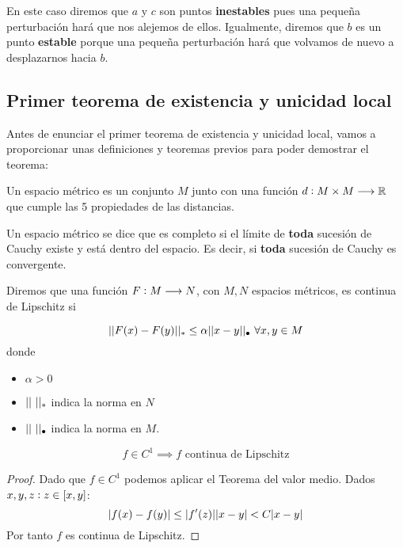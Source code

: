 En este caso diremos que $a$ y $c$ son puntos \textbf{inestables} pues una pequeña perturbación hará que nos alejemos de ellos. Igualmente, diremos que $b$ es un punto \textbf{estable} porque una pequeña perturbación hará que volvamos de nuevo a desplazarnos hacia $b$.


\subsection{Primer teorema de existencia y unicidad local}
Antes de enunciar el primer teorema de existencia y unicidad local, vamos a proporcionar unas definiciones y teoremas previos para poder demostrar el teorema:

\begin{definition}
Un espacio métrico es un conjunto $M$ junto con una función $d: M\times M \longrightarrow \mathbb{R}$ que cumple las 5 propiedades de las distancias.
\end{definition}

\begin{definition}
Un espacio métrico se dice que es completo si el límite de \textbf{toda} sucesión de Cauchy existe y está dentro del espacio. Es decir, si \textbf{toda} sucesión de Cauchy es convergente.
\end{definition}

\begin{definition}
Diremos que una función $F: M \longrightarrow N$, con $M, N$ espacios métricos, es continua de Lipschitz si

$$||F(x)-F(y)||_* \leq \alpha||x-y||_\bullet\ \forall x,y\in M$$ donde 
\begin{itemize}
\item $\alpha > 0$
\item $||\ ||_*$ indica la norma en $N$
\item $||\ ||_\bullet$ indica la norma en $M$.
\end{itemize}
\end{definition}

\begin{lemma}
$$f\in C^1 \implies f \text{ continua de Lipschitz}$$
\end{lemma}
\begin{proof}
Dado que $f\in C^1$ podemos aplicar el Teorema del valor medio. Dados $x,y,z : z\in[x,y]$:
$$|f(x) - f(y)| \leq |f^\prime(z)||x-y| < C|x-y|$$
Por tanto $f$ es continua de Lipschitz.
\end{proof}

